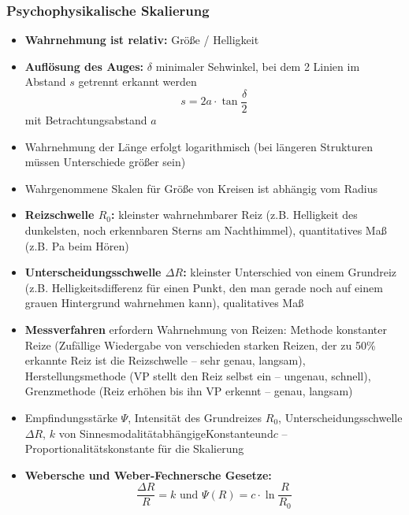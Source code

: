 \documentclass[12pt,landscape]{article}
\begin{document}
\begin{multicols}{3}
\subsubsection{Psychophysikalische Skalierung}
\begin{itemize}
\item \textbf{Wahrnehmung ist relativ:} Größe / Helligkeit 
\item \textbf{Auflösung des Auges:} $\delta$ minimaler Sehwinkel, bei dem 2 Linien im Abstand $s$ getrennt erkannt werden\[s = 2a \cdot \tan{\frac{\delta}{2}}\] mit Betrachtungsabstand $a$
\item Wahrnehmung der Länge erfolgt logarithmisch (bei längeren Strukturen müssen Unterschiede größer sein)
\item Wahrgenommene Skalen für Größe von Kreisen ist abhängig vom Radius
\item \textbf{Reizschwelle $R_0$:} kleinster wahrnehmbarer Reiz (z.B. Helligkeit des dunkelsten, noch erkennbaren Sterns am Nachthimmel), quantitatives Maß (z.B. Pa beim Hören) 
\item \textbf{Unterscheidungsschwelle $\Delta R$:} kleinster Unterschied von einem Grundreiz (z.B. Helligkeitsdifferenz für einen Punkt, den man gerade noch auf einem grauen Hintergrund wahrnehmen kann), qualitatives Maß 
\item \textbf{Messverfahren} erfordern Wahrnehmung von Reizen: Methode konstanter Reize (Zufällige Wiedergabe von verschieden starken Reizen, der zu 50\% erkannte Reiz ist die Reizschwelle -- sehr genau, langsam), Herstellungsmethode (VP stellt den Reiz selbst ein -- ungenau, schnell), Grenzmethode (Reiz erhöhen bis ihn VP erkennt -- genau, langsam)
\item Empfindungsstärke $\Psi$, Intensität des Grundreizes $R_0$, Unterscheidungsschwelle $\Delta R$, $k$ von Sinnesmodalität\hfill abhängige\hfill Konstante\hfill und\newline $c$ -- Proportionalitätskonstante für die Skalierung
\item \textbf{Webersche und Weber-Fechnersche Gesetze:}\\
\[\frac{\Delta R}{R} = k \text{ und }\Psi(R) = c \cdot \ln{\frac{R}{R_0}}\]


\end{itemize}
\end{multicols}
\end{document}
